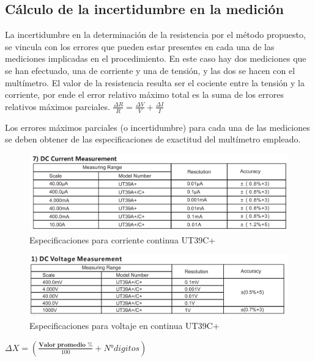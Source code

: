 \documentclass[12pt, letterpaper]{article}
\begin{document}
\subsection{Cálculo de la incertidumbre en la medición}

La incertidumbre en la determinación de la resistencia por el método propuesto, se vincula con los 
errores que pueden estar presentes en cada una de las mediciones implicadas en el procedimiento. En 
este caso hay dos mediciones que se han efectuado, una de corriente y una de tensión, y las dos se 
hacen con el multímetro. El valor de la resistencia resulta ser el cociente entre la tensión y la 
corriente, por ende el error relativo máximo total es la suma de los errores relativos máximos parciales.
\singlespacing
$\frac{\Delta R}{R} = \frac{\Delta V}{V}+\frac{\Delta I}{I}$

\singlespacing

Los errores máximos parciales (o incertidumbre) para cada una de las mediciones se deben 
obtener de las especificaciones de exactitud del multímetro empleado. 
\singlespacing
\begin{figure}[H]
	\centering
	\includegraphics{imagenes/DC_ut39c.png}
	\caption{Especificaciones para corriente continua UT39C+}
	\label{fig:DC_UT39C}
\end{figure}
\begin{figure}[H]
	\centering
	\includegraphics{imagenes/DV_ut39c.png}
	\caption{Especificaciones para voltaje en continua UT39C+}
	\label{fig:DV_UT39C}
\end{figure}
\singlespacing
$\Delta X=( \frac{\textbf{Valor promedio \%}}{100} + N° digitos)$
\singlespacing
\end{document}
